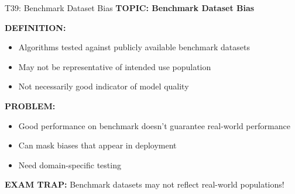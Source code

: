 \documentclass[8pt]{beamer}
\begin{document}
	\begin{frame}{T39: Benchmark Dataset Bias}
		\fontsize{6.5}{7.5}\selectfont
		\textbf{TOPIC: Benchmark Dataset Bias}
		
		\vspace{0.1cm}
		\textbf{DEFINITION:}
		\begin{itemize}
			\item Algorithms tested against publicly available benchmark datasets
			\item May not be representative of intended use population
			\item Not necessarily good indicator of model quality
		\end{itemize}
		
		\vspace{0.1cm}
		\textbf{PROBLEM:}
		\begin{itemize}
			\item Good performance on benchmark doesn't guarantee real-world performance
			\item Can mask biases that appear in deployment
			\item Need domain-specific testing
		\end{itemize}
		
		\textcolor{myred}{\textbf{EXAM TRAP:}} Benchmark datasets may \textcolor{myblue}{not reflect real-world populations}!
	\end{frame}
	
\end{document}
